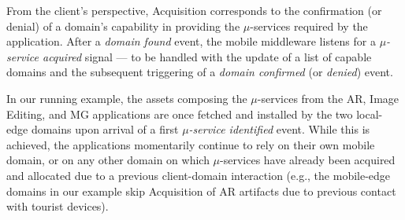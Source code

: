 
%
%	
%	
%	


From the client's perspective, Acquisition corresponds to the confirmation (or denial) of a domain's capability in providing the $\mu$-services required by the application. After a \textit{domain found} event, the mobile middleware listens for a \textit{$\mu$-service acquired} signal --- to be handled with the update of a list of capable domains and the subsequent triggering of a \textit{domain confirmed} (or \textit{denied}) event.

In our running example, the assets composing the $\mu$-services from the AR, Image Editing, and MG applications are once fetched and installed by the two local-edge domains upon arrival of a first \textit{$\mu$-service identified} event. While this is achieved, the applications momentarily continue to rely on their own mobile domain, or on any other domain on which $\mu$-services have already been acquired and allocated due to a previous client-domain interaction (e.g., the mobile-edge domains in our example skip Acquisition of AR artifacts due to previous contact with tourist devices).


